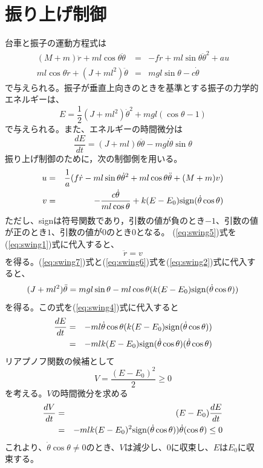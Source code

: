 \documentclass[a4j,11pt,twoside]{ujbook}
\begin{document}
\begin{figure}[htbp]
\begin{center}
	\section{振り上げ制御}	
		台車と振子の運動方程式は
		\begin{eqnarray}
			(M + m)\ddot{r} + ml\cos\theta\ddot{\theta} &=& -f\dot{r} + ml\sin\theta\ddot{\theta}^{2} + au \label{eq:swing1}\\
			ml\cos\theta\ddot{r} + (J + ml^2)\ddot{\theta} &=& mgl\sin\theta - c\dot{\theta} \label{eq:swing2}
		\end{eqnarray}
		で与えられる。振子が垂直上向きのときを基準とする振子の力学的エネルギーは、
		\begin{equation}
			E = \frac{1}{2}(J + ml^2){\dot{\theta}}^2 + mgl(\cos\theta - 1)
		\end{equation}
		で与えられる。また、エネルギーの時間微分は
		\begin{equation}
			\frac{dE}{dt} = (J + ml)\theta\ddot{\theta} - mgl\dot{\theta}\sin\theta \label{eq:swing4}
		\end{equation}
		振り上げ制御のために，次の制御側を用いる。
		\begin{eqnarray}
			u &=& \frac{1}{a}(f\dot{r} - ml\sin\theta\dot{\theta}^{2} + ml\cos\theta\ddot{\theta} + (M + m)v) \label{eq:swing5}\\
			v &=& -\frac{c\dot{\theta}}{ml\cos\theta} + k(E-E_{0}){\rm sign}(\dot\theta\cos\theta) \label{eq:swing6}
		\end{eqnarray}
		ただし、signは符号関数であり，引数の値が負のとき$-1$、引数の値が正のとき$1$、引数の値が$0$のとき$0$となる。
		(\ref{eq:swing5})式を(\ref{eq:swing1})式に代入すると、
		\begin{equation}
			\ddot{r} = v \label{eq:swing7}
		\end{equation}
		を得る。(\ref{eq:swing7})式と(\ref{eq:swing6})式を(\ref{eq:swing2})式に代入すると、
		\begin{equation}
			(J + ml^2)\ddot{\theta} = mgl\sin\theta - ml\cos\theta(k(E-E_{0}){\rm sign}(\dot{\theta}\cos\theta))
		\end{equation}
		を得る。この式を(\ref{eq:swing4})式に代入すると
		\begin{eqnarray*}
			\frac{dE}{dt} 
			&=&-ml\dot\theta\cos\theta(k(E-E_{0})\rm{sign}(\dot{\theta}\cos\theta))\\
			&=&-mlk(E-E_{0})\rm{sign}(\dot{\theta}\cos\theta)(\dot{\theta}\cos\theta)
		\end{eqnarray*}
		リアプノフ関数の候補として
		\begin{equation}
			V = \frac{(E - E_{0})^{2}}{2} \geq 0
		\end{equation}
		を考える。$V$の時間微分を求める
		\begin{eqnarray*}
			\frac{dV}{dt} &=& (E - E_{0})\frac{dE}{dt}\\
			&=&  -mlk(E-E_{0})^{2}{\rm sign}(\dot{\theta}\cos\theta))\dot{\theta}(\cos\theta)  \le 0
		\end{eqnarray*}
		これより、$\dot{\theta}\cos\theta\neq0$のとき、$V$は減少し、$0$に収束し、$E$は$E_{0}$に収束する。
		

\end{center}
\end{figure}
\end{document}
